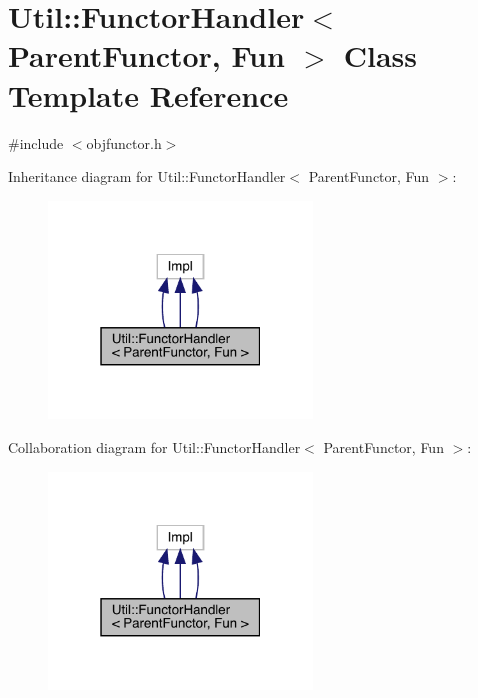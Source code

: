 \hypertarget{classUtil_1_1FunctorHandler}{}\section{Util\+:\+:Functor\+Handler$<$ Parent\+Functor, Fun $>$ Class Template Reference}
\label{classUtil_1_1FunctorHandler}


{\ttfamily \#include $<$objfunctor.\+h$>$}



Inheritance diagram for Util\+:\+:Functor\+Handler$<$ Parent\+Functor, Fun $>$\+:
\nopagebreak
\begin{figure}[H]
\begin{center}
\leavevmode
\includegraphics[width=199pt]{d8/db9/classUtil_1_1FunctorHandler__inherit__graph}
\end{center}
\end{figure}


Collaboration diagram for Util\+:\+:Functor\+Handler$<$ Parent\+Functor, Fun $>$\+:
\nopagebreak
\begin{figure}[H]
\begin{center}
\leavevmode
\includegraphics[width=199pt]{df/df4/classUtil_1_1FunctorHandler__coll__graph}
\end{center}
\end{figure}
